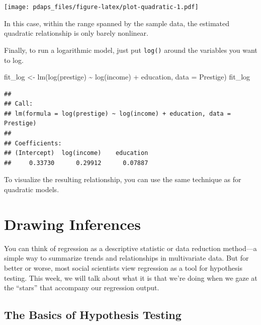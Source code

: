 \documentclass[
  12pt,
  oneside,openany]{book}
\newenvironment{Shaded}{\begin{snugshade}}{\end{snugshade}}
\newcommand{\AttributeTok}[1]{\textcolor[rgb]{0.77,0.63,0.00}{#1}}
\newcommand{\FunctionTok}[1]{\textcolor[rgb]{0.00,0.00,0.00}{#1}}
\newcommand{\NormalTok}[1]{#1}
\newcommand{\OtherTok}[1]{\textcolor[rgb]{0.56,0.35,0.01}{#1}}
\newcommand{\SpecialCharTok}[1]{\textcolor[rgb]{0.00,0.00,0.00}{#1}}
\begin{document}
\texttt{[image: pdaps\_files/figure-latex/plot-quadratic-1.pdf]}

In this case, within the range spanned by the sample data, the estimated quadratic relationship is only barely nonlinear.

Finally, to run a logarithmic model, just put \texttt{log()} around the variables you want to log.

\begin{Shaded}
\begin{Highlighting}[]
\NormalTok{fit\_log }\OtherTok{\textless{}{-}} \FunctionTok{lm}\NormalTok{(}\FunctionTok{log}\NormalTok{(prestige) }\SpecialCharTok{\textasciitilde{}} \FunctionTok{log}\NormalTok{(income) }\SpecialCharTok{+}\NormalTok{ education, }\AttributeTok{data =}\NormalTok{ Prestige)}
\NormalTok{fit\_log}
\end{Highlighting}
\end{Shaded}

\begin{verbatim}
## 
## Call:
## lm(formula = log(prestige) ~ log(income) + education, data = Prestige)
## 
## Coefficients:
## (Intercept)  log(income)    education  
##     0.33730      0.29912      0.07887
\end{verbatim}

To visualize the resulting relationship, you can use the same technique as for quadratic models.

\hypertarget{inference}{%
\chapter{Drawing Inferences}\label{inference}}

\providecommand{\Cov}{}
\renewcommand{\Cov}{\mathop{\rm Cov}\nolimits}
\providecommand{\SE}{}
\renewcommand{\SE}{\mathop{\rm SE}\nolimits}
\providecommand{\CI}{}
\renewcommand{\CI}{\mathop{\rm CI}\nolimits}

You can think of regression as a descriptive statistic or data reduction method---a simple way to summarize trends and relationships in multivariate data. But for better or worse, most social scientists view regression as a tool for hypothesis testing. This week, we will talk about what it is that we're doing when we gaze at the ``stars'' that accompany our regression output.

\hypertarget{the-basics-of-hypothesis-testing}{%
\section{The Basics of Hypothesis Testing}\label{the-basics-of-hypothesis-testing}}
\end{document}
